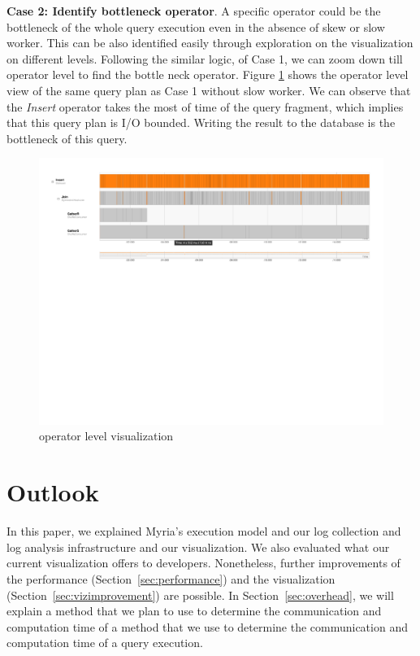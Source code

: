 \documentclass[11pt]{scrartcl}
\begin{document}
\noindent \textbf{Case 2: Identify bottleneck operator}.
A specific operator could be the bottleneck of the whole query execution even in the absence of skew or slow worker. This can be also identified easily through exploration on the visualization on different levels. Following the similar logic, of Case 1, we can zoom down till operator level to find the bottle neck operator. Figure \ref{fig:bottleneck_operator} shows the operator level view of the same query plan as Case 1 without slow worker. We can observe that the \emph{Insert} operator takes the most of time of the query fragment, which implies that this query plan is I/O bounded. Writing the result to the database is the bottleneck of this query.

\begin{figure}[h]
  \begin{center}
	\includegraphics[width=\textwidth]{bottleneck_operator.pdf}
  \end{center}
 \caption{operator level visualization}
  \label{fig:bottleneck_operator}
 \end{figure}



\section{Outlook}
\label{sec:outlook}

In this paper, we explained Myria's execution model and our log collection and log analysis infrastructure and our visualization. We also evaluated what our current visualization offers to developers. Nonetheless, further improvements of the performance (Section~\ref{sec:performance}) and the visualization (Section~\ref{sec:vizimprovement}) are possible. In Section~\ref{sec:overhead}, we will explain a method that we  plan to use to determine the communication and computation time of a method that we use to determine the communication and computation time of a query execution. 
\end{document}
